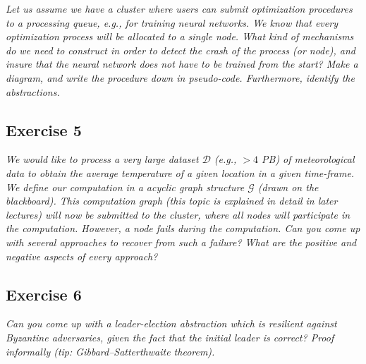 \emph{Let us assume we have a cluster where users can submit optimization procedures to a processing queue, e.g., for training neural networks. We know that every optimization process will be allocated to a single node. What kind of mechanisms do we need to construct in order to detect the crash of the process (or node), and insure that the neural network does not have to be trained from the start? Make a diagram, and write the procedure down in pseudo-code. Furthermore, identify the abstractions.}

\subsection*{Exercise 5}
\label{sec:exercise_5}

\emph{We would like to process a very large dataset $\mathcal{D}$ (e.g., $> 4$ PB) of meteorological data to obtain the average temperature of a given location in a given time-frame. We define our computation in a acyclic graph structure $\mathcal{G}$ (drawn on the blackboard). This computation graph (this topic is explained in detail in later lectures) will now be submitted to the cluster, where all nodes will participate in the computation. However, a node fails during the computation. Can you come up with several approaches to recover from such a failure? What are the positive and negative aspects of every approach?}

\subsection*{Exercise 6}
\label{sec:exercise_6}

\emph{Can you come up with a leader-election abstraction which is resilient against Byzantine adversaries, given the fact that the initial leader is correct? Proof informally (tip: Gibbard–Satterthwaite theorem).}



